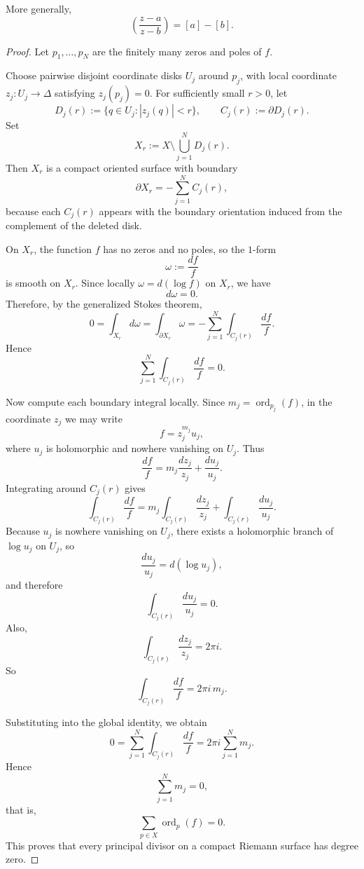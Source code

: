 \documentclass[11pt,openany]{article}
\begin{document}
\begin{example}
	More generally,
	\[
	\left(\frac{z-a}{z-b}\right)=[a]-[b].
	\]
\end{example}

\newpage
{}

\begin{proof}
	Let $p_1,\dots,p_N$ are the finitely many zeros and poles of $f$.
	
	Choose pairwise disjoint coordinate disks $U_j$ around $p_j$, with local coordinate
	$z_j:U_j\to \Delta$ satisfying $z_j(p_j)=0$. For sufficiently small $r>0$, let
	\[
	D_j(r):=\{q\in U_j:|z_j(q)|<r\},
	\qquad
	C_j(r):=\partial D_j(r).
	\]
	Set
	\[
	X_r:=X\setminus \bigcup_{j=1}^N D_j(r).
	\]
	Then $X_r$ is a compact oriented surface with boundary
	\[
	\partial X_r=-\sum_{j=1}^N C_j(r),
	\]
	because each $C_j(r)$ appears with the boundary orientation induced from the
	complement of the deleted disk.
	
	On $X_r$, the function $f$ has no zeros and no poles, so the $1$-form
	\[
	\omega:=\frac{df}{f}
	\]
	is smooth on $X_r$. Since locally $\omega=d(\log f)$ on $X_r$, we have
	\[
	d\omega=0.
	\]
	Therefore, by the generalized Stokes theorem,
	\[
	0=\int_{X_r} d\omega=\int_{\partial X_r}\omega
	=-\sum_{j=1}^N \int_{C_j(r)} \frac{df}{f}.
	\]
	Hence
	\[
	\sum_{j=1}^N \int_{C_j(r)} \frac{df}{f}=0.
	\]
	
	Now compute each boundary integral locally. Since $m_j=\operatorname{ord}_{p_j}(f)$,
	in the coordinate $z_j$ we may write
	\[
	f=z_j^{m_j}u_j,
	\]
	where $u_j$ is holomorphic and nowhere vanishing on $U_j$. Thus
	\[
	\frac{df}{f}
	=
	m_j \frac{dz_j}{z_j}
	+
	\frac{du_j}{u_j}.
	\]
	Integrating around $C_j(r)$ gives
	\[
	\int_{C_j(r)} \frac{df}{f}
	=
	m_j \int_{C_j(r)} \frac{dz_j}{z_j}
	+
	\int_{C_j(r)} \frac{du_j}{u_j}.
	\]
	Because $u_j$ is nowhere vanishing on $U_j$, there exists a holomorphic branch of
	$\log u_j$ on $U_j$, so
	\[
	\frac{du_j}{u_j}=d(\log u_j),
	\]
	and therefore
	\[
	\int_{C_j(r)} \frac{du_j}{u_j}=0.
	\]
	Also,
	\[
	\int_{C_j(r)} \frac{dz_j}{z_j}=2\pi i.
	\]
	So
	\[
	\int_{C_j(r)} \frac{df}{f}=2\pi i\, m_j.
	\]
	
	Substituting into the global identity, we obtain
	\[
	0=\sum_{j=1}^N \int_{C_j(r)} \frac{df}{f}
	=2\pi i \sum_{j=1}^N m_j.
	\]
	Hence
	\[
	\sum_{j=1}^N m_j=0,
	\]
	that is,
	\[
	\sum_{p\in X}\operatorname{ord}_p(f)=0.
	\]
	This proves that every principal divisor on a compact Riemann surface has degree zero.
\end{proof}
\end{document}
